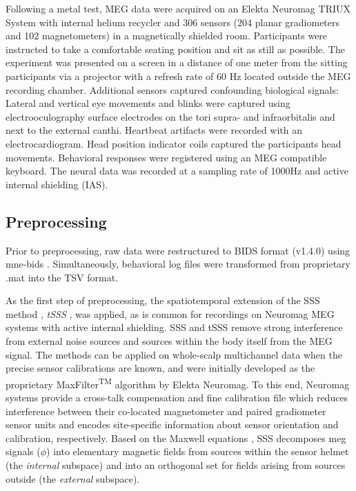 Following a metal test, MEG data were acquired on an Elekta Neuromag TRIUX System with internal helium recycler and 306 sensors (204 planar gradiometers and 102 magnetometers) in a magnetically shielded room.
Participants were instructed to take a comfortable seating position and sit as still as possible.
The experiment was presented on a screen in a distance of one meter from the sitting participants via a projector with a refresh rate of 60 Hz located outside the MEG recording chamber.
Additional sensors captured confounding biological signals:
Lateral and vertical eye movements and blinks were captured using electrooculography surface electrodes on the tori supra- and infraorbitalis and next to the external canthi.
Heartbeat artifacts were recorded with an electrocardiogram.
Head position indicator coils captured the participants head movements.
Behavioral responses were registered using an MEG compatible keyboard.
The neural data was recorded at a sampling rate of 1000Hz and active internal shielding (IAS).


\subsection{Preprocessing}

Prior to preprocessing, raw data were restructured to \gls{BIDS} format (v1.4.0) using mne-bids \citep{Appelhoff2019}.
Simultaneously, behavioral log files were transformed from proprietary .mat into the TSV format.

As the first step of preprocessing, the spatiotemporal extension of the \gls{SSS} method \citep{taulu2005presentation}, \textit{\gls{tSSS}} \citep{taulu2006spatiotemporal}, was applied, as is common for recordings on Neuromag MEG systems with active internal shielding.
\gls{SSS} and \gls{tSSS} remove strong interference from external noise sources and sources within the body itself from the MEG signal.
The methods can be applied on whole-scalp multichannel data when the precise sensor calibrations are known, and were initially developed as the proprietary MaxFilter\textsuperscript{TM} algorithm by Elekta Neuromag.
To this end, Neuromag systems provide a cross-talk compensation and fine calibration file which reduces interference between their co-located magnetometer and paired gradiometer sensor units and encodes site-specific information about sensor orientation and calibration, respectively.
Based on the Maxwell equations \citep{taulu2006spatiotemporal}, \gls{SSS} decomposes \gls{meg} signals ($\phi$) into elementary magnetic fields from sources within the sensor helmet (the \textit{internal} subspace) and into an orthogonal set for fields arising from sources outside (the \textit{external} subspace).

